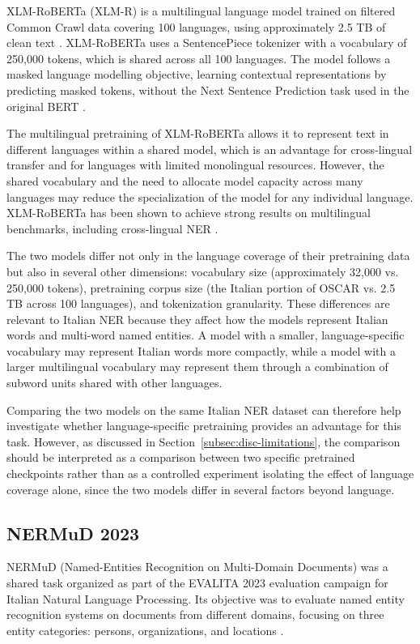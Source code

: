 XLM-RoBERTa (XLM-R) is a multilingual language model trained on filtered Common Crawl data covering 100 languages, using approximately 2.5 TB of clean text \cite{conneau2020xlmr}. XLM-RoBERTa uses a SentencePiece tokenizer with a vocabulary of 250,000 tokens, which is shared across all 100 languages. The model follows a masked language modelling objective, learning contextual representations by predicting masked tokens, without the Next Sentence Prediction task used in the original BERT \cite{conneau2020xlmr}.

The multilingual pretraining of XLM-RoBERTa allows it to represent text in different languages within a shared model, which is an advantage for cross-lingual transfer and for languages with limited monolingual resources. However, the shared vocabulary and the need to allocate model capacity across many languages may reduce the specialization of the model for any individual language. XLM-RoBERTa has been shown to achieve strong results on multilingual benchmarks, including cross-lingual NER \cite{conneau2020xlmr}.

The two models differ not only in the language coverage of their pretraining data but also in several other dimensions: vocabulary size (approximately 32,000 vs. 250,000 tokens), pretraining corpus size (the Italian portion of OSCAR vs. 2.5 TB across 100 languages), and tokenization granularity. These differences are relevant to Italian NER because they affect how the models represent Italian words and multi-word named entities. A model with a smaller, language-specific vocabulary may represent Italian words more compactly, while a model with a larger multilingual vocabulary may represent them through a combination of subword units shared with other languages.

Comparing the two models on the same Italian NER dataset can therefore help investigate whether language-specific pretraining provides an advantage for this task. However, as discussed in Section~\ref{subsec:disc-limitations}, the comparison should be interpreted as a comparison between two specific pretrained checkpoints rather than as a controlled experiment isolating the effect of language coverage alone, since the two models differ in several factors beyond language.
\subsection{NERMuD 2023}
\label{subsec:nermud}

NERMuD (Named-Entities Recognition on Multi-Domain Documents) was a shared task organized as part of the EVALITA 2023 evaluation campaign for Italian Natural Language Processing. Its objective was to evaluate named entity recognition systems on documents from different domains, focusing on three entity categories: persons, organizations, and locations \cite{palmeroaprosio2023nermud}.

